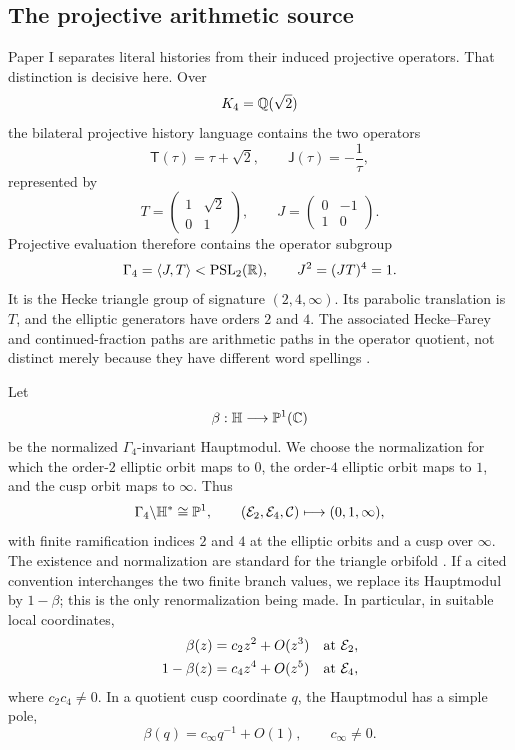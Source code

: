 \subsection{The projective arithmetic source}

Paper I separates literal histories from their induced projective operators.  That
distinction is decisive here.  Over
\[
 K_4=\mathbb{Q}(\sqrt2)
\]
the bilateral projective history language contains the two operators
\begin{equation}
 \mathsf T(\tau)=\tau+\sqrt2,
 \qquad
 \mathsf J(\tau)=-\frac1\tau,
 \label{eq:q4-projective-generators}
\end{equation}
represented by
\[
 T=\begin{pmatrix}1&\sqrt2\\0&1\end{pmatrix},
 \qquad
 J=\begin{pmatrix}0&-1\\1&0\end{pmatrix}.
\]
Projective evaluation therefore contains the operator subgroup
\begin{equation}
 \Gamma_4=\langle J,T\rangle<\operatorname{PSL}_2(\mathbb{R}),
 \qquad J^2=(JT)^4=1.
 \label{eq:q4-hecke-group}
\end{equation}
It is the Hecke triangle group of signature $(2,4,\infty)$.  Its parabolic
translation is $T$, and the elliptic generators have orders $2$ and $4$.
The associated Hecke--Farey and continued-fraction paths are arithmetic paths in
the operator quotient, not distinct merely because they have different word
spellings \cite{Rosen1954ContinuedFractions,LangLang2016HeckeGroups}.

Let
\[
 \beta:\mathbb{H}\longrightarrow\mathbb P^1(\mathbb{C})
\]
be the normalized $\Gamma_4$-invariant Hauptmodul.  We choose the normalization
for which the order-$2$ elliptic orbit maps to $0$, the order-$4$ elliptic orbit
maps to $1$, and the cusp orbit maps to $\infty$.  Thus
\begin{equation}
 \Gamma_4\backslash\mathbb{H}^*\cong\mathbb P^1,
 \qquad
 (\mathcal E_2,\mathcal E_4,\mathcal C)
 \longmapsto(0,1,\infty),
 \label{eq:q4-hauptmodul-normalization}
\end{equation}
with finite ramification indices $2$ and $4$ at the elliptic orbits and a cusp over
$\infty$.  The existence and normalization are standard for the triangle orbifold
\cite{Beardon1983DiscreteGroups,DoranEtAl2013TriangleForms}.  If a cited convention
interchanges the two finite branch values, we replace its Hauptmodul by $1-\beta$;
this is the only renormalization being made.  In particular, in
suitable local coordinates,
\begin{align}
 \beta(z)&=c_2z^2+O(z^3) &&\text{at }\mathcal E_2,\notag\\
 1-\beta(z)&=c_4z^4+O(z^5) &&\text{at }\mathcal E_4,
 \label{eq:q4-elliptic-expansions}
\end{align}
where $c_2c_4\ne0$.  In a quotient cusp coordinate $q$, the Hauptmodul has a
simple pole,
\begin{equation}
 \beta(q)=c_\infty q^{-1}+O(1),
 \qquad c_\infty\ne0.
 \label{eq:q4-cusp-expansion}
\end{equation}

